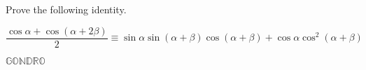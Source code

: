 \documentclass[a4paper,landscape]{memoir}
\begin{document}
\thispagestyle{empty}
Prove the following identity.
\begin{Huge}
    \begin{vplace}[0.69]
\[\frac{\cos\alpha+\cos(\alpha+2\beta)}2\equiv \sin\alpha\sin(\alpha+\beta)\cos(\alpha+\beta)+\cos\alpha\cos^2(\alpha+\beta)\]
    \end{vplace}
\end{Huge}
\(\mathbb{GONDRO}\)
\end{document}
